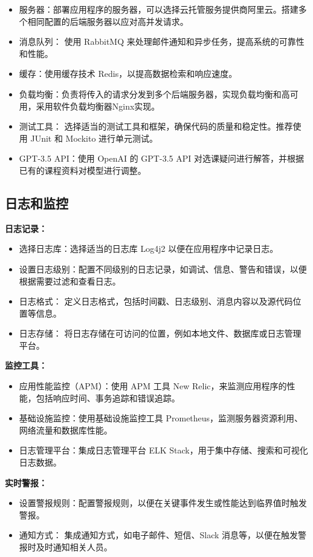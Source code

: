 \documentclass{article}
\begin{document}
\begin{itemize}
    \item 服务器：部署应用程序的服务器，可以选择云托管服务提供商阿里云。搭建多个相同配置的后端服务器以应对高并发请求。
    \item 消息队列： 使用 RabbitMQ 来处理邮件通知和异步任务，提高系统的可靠性和性能。
    \item 缓存：使用缓存技术 Redis，以提高数据检索和响应速度。
    \item 负载均衡：负责将传入的请求分发到多个后端服务器，实现负载均衡和高可用，采用软件负载均衡器Nginx实现。
    \item 测试工具： 选择适当的测试工具和框架，确保代码的质量和稳定性。推荐使用 JUnit 和 Mockito 进行单元测试。
    \item GPT-3.5 API：使用 OpenAI 的 GPT-3.5 API 对选课疑问进行解答，并根据已有的课程资料对模型进行调整。
\end{itemize}

\subsection{日志和监控}

\textbf{日志记录：}
\begin{itemize}
    \item 选择日志库：选择适当的日志库 Log4j2 以便在应用程序中记录日志。
    \item 设置日志级别：配置不同级别的日志记录，如调试、信息、警告和错误，以便根据需要过滤和查看日志。
    \item 日志格式： 定义日志格式，包括时间戳、日志级别、消息内容以及源代码位置等信息。
    \item 日志存储： 将日志存储在可访问的位置，例如本地文件、数据库或日志管理平台。
\end{itemize}

\textbf{监控工具：}
\begin{itemize}
    \item 应用性能监控（APM）：使用 APM 工具 New Relic，来监测应用程序的性能，包括响应时间、事务追踪和错误追踪。
    \item 基础设施监控：使用基础设施监控工具 Prometheus，监测服务器资源利用、网络流量和数据库性能。
    \item 日志管理平台：集成日志管理平台 ELK Stack，用于集中存储、搜索和可视化日志数据。
\end{itemize}

\textbf{实时警报：}
\begin{itemize}
    \item 设置警报规则：配置警报规则，以便在关键事件发生或性能达到临界值时触发警报。
    \item 通知方式： 集成通知方式，如电子邮件、短信、Slack 消息等，以便在触发警报时及时通知相关人员。
\end{itemize}
\end{document}
